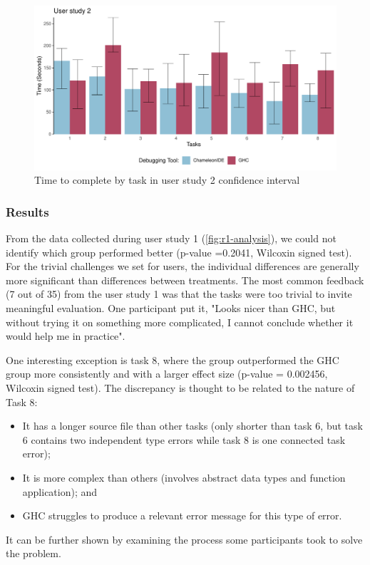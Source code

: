 \begin{figure}[h]
    \centering
    \includegraphics[width=\linewidth]{images/r2-data.pdf}
    \caption{Time to complete by task in user study 2 confidence interval}
    \label{fig:r2-analysis}
\end{figure}

\subsubsection*{\textbf {Results}}

From the data collected during user study 1 (\ref{fig:r1-analysis}), we could not identify which group performed better (p-value =0.2041, Wilcoxin signed test). For the trivial challenges we set for users, the individual differences are generally more significant than differences between treatments. 
The most common feedback (7 out of 35) from the user study 1 was that the tasks were too trivial to invite meaningful evaluation. One participant put it, "Looks nicer than GHC, but without trying it on something more complicated, I cannot conclude whether it would help me in practice".

One interesting exception is task 8, where the \chameleon{} group outperformed the GHC group more consistently and with a larger effect size (p-value = 0.002456, Wilcoxin signed test). The discrepancy is thought to be related to the nature of Task 8:
\begin{itemize}
    \item {It has a longer source file than other tasks (only shorter than task 6, but task
    6 contains two independent type errors while task 8 is one connected task
    error);}
    \item {It is more complex than others (involves abstract data types and function application); and
    }
    \item {
        GHC struggles to produce a relevant error message for this type of error.
    }
  \end{itemize}
It can be further shown by examining the process some participants took to solve the problem.


